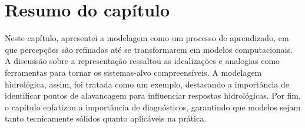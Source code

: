 \documentclass[./main.tex]{subfiles}
\begin{document}
\clearpage




\section{Resumo do capítulo} \label{sec:sys:summary}

\par Neste capítulo, apresentei a modelagem como um processo de aprendizado, em que percepções são refinadas até se transformarem em modelos computacionais. A discussão sobre a representação ressaltou as idealizações e analogias como ferramentas para tornar os sistemas-alvo compreensíveis. A modelagem hidrológica, assim, foi tratada como um exemplo, destacando a importância de identificar pontos de alavancagem para influenciar respostas hidrológicas. Por fim, o capítulo enfatizou a importância de diagnósticos, garantindo que modelos sejam tanto tecnicamente sólidos quanto aplicáveis na prática.
\end{document}
